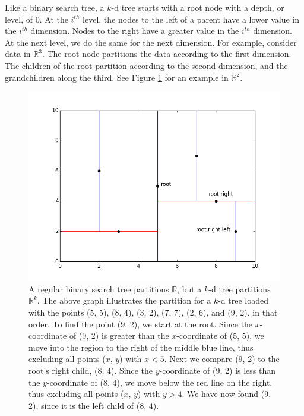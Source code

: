 Like a binary search tree, a $k$-d tree starts with a root node with a depth, or level, of 0.
At the $i^{th}$ level, the nodes to the left of a parent have a lower value in the $i^{th}$ dimension.
Nodes to the right have a greater value in the $i^{th}$ dimension.
At the next level, we do the same for the next dimension.
For example, consider data in $\mathbb{R}^3$.
The root node partitions the data according to the first dimension.
The children of the root partition according to the second dimension, and the grandchildren along the third.
See Figure \ref{fig:k-binary-search} for an example in $\mathbb{R}^2$.

\begin{figure}[H]
\includegraphics[width=\textwidth]{kdpic1.png}
\caption{A regular binary search tree partitions $\mathbb{R}$, but a $k$-d tree partitions $\mathbb{R}^{k}$. The above graph illustrates the partition for a $k$-d tree loaded with the points (5, 5), (8, 4), (3, 2), (7, 7), (2, 6), and (9, 2), in that order. To find the point (9, 2), we start at the root. Since the $x$-coordinate of (9, 2) is greater than the $x$-coordinate of (5, 5), we move into the region to the right of the middle blue line, thus excluding all points ($x$, $y$) with $x < 5$. Next we compare (9, 2) to the root's right child, (8, 4). Since the $y$-coordinate of (9, 2) is less than the $y$-coordinate of (8, 4), we move below the red line on the right, thus excluding all points ($x$, $y$) with $y > 4$. We have now found (9, 2), since it is the left child of (8, 4).}
\label{fig:k-binary-search}
\end{figure}


